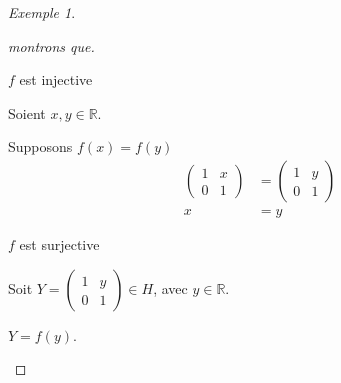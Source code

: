 \documentclass{report}
\newcommand*{\reels}{\mathbb{R}}
\theoremstyle{definition}
\theoremstyle{remark}
\newtheorem*{exem}{Exemple}
\begin{document}
\begin{exem}
\begin{nlist}
\begin{proof}[montrons que]
				\begin{ulist}
					\item $f$ est injective

					Soient $x,y \in \reels$.

					Supposons $f(x)=f(y)$
					\begin{align*}
						\begin{pmatrix}
							1&x\\0&1
						\end{pmatrix}&= \begin{pmatrix}
							1&y\\0&1
						\end{pmatrix}\\
						x&= y
					\end{align*}
					\item $f$ est surjective

					Soit $Y = \begin{pmatrix}
						1&y\\0&1
					\end{pmatrix} \in H$, avec $y \in \reels$.

					$Y = f(y)$.
				\end{ulist}
			\end{proof}
		\end{nlist}
	\end{exem}
\end{document}
